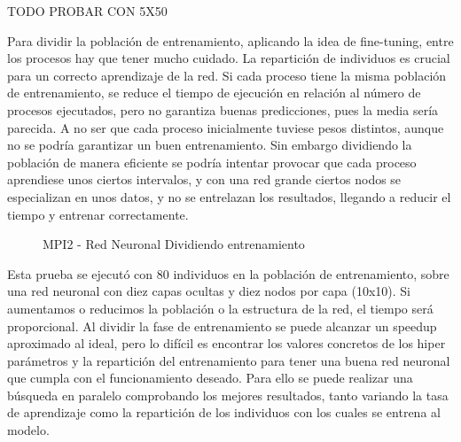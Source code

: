
\color{blue} TODO PROBAR CON 5X50

\color{black}
\newpage

Para dividir la población de entrenamiento, aplicando la idea de fine-tuning, entre los procesos hay que tener mucho cuidado. La repartición de individuos es crucial para un correcto aprendizaje de la red. Si cada proceso tiene la misma población de entrenamiento, se reduce el tiempo de ejecución en relación al número de procesos ejecutados, pero no garantiza buenas predicciones, pues la media sería parecida. A no ser que cada proceso inicialmente tuviese pesos distintos, aunque no se podría garantizar un buen entrenamiento. Sin embargo dividiendo la población de manera eficiente se podría intentar provocar que cada proceso aprendiese unos ciertos intervalos, y con una red grande ciertos nodos se especializan en unos datos, y no se entrelazan los resultados, llegando a reducir el tiempo y entrenar correctamente.

\begin{figure}[!h]
	\centering
	\caption{MPI2 - Red Neuronal Dividiendo entrenamiento}
\end{figure}

Esta prueba se ejecutó con 80 individuos en la población de entrenamiento, sobre una red neuronal con diez capas ocultas y diez nodos por capa (10x10). Si aumentamos o reducimos la población o la estructura de la red, el tiempo será proporcional.
Al dividir la fase de entrenamiento se puede alcanzar un speedup aproximado al ideal, pero lo difícil es encontrar los valores concretos de los hiper parámetros y la repartición del entrenamiento para tener una buena red neuronal que cumpla con el funcionamiento deseado. Para ello se puede realizar una búsqueda en paralelo comprobando los mejores resultados, tanto variando la tasa de aprendizaje como la repartición de los individuos con los cuales se entrena al modelo.

